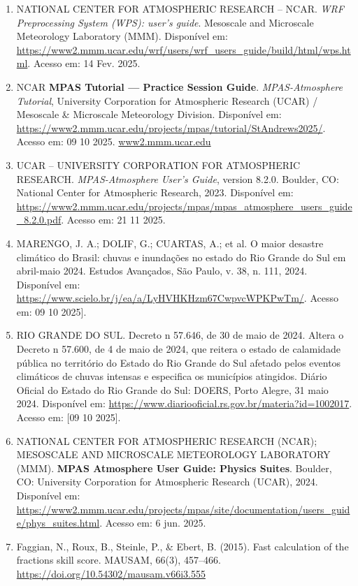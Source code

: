 \documentclass[12pt,a4paper,oneside]{book}
\begin{document}
\begin{enumerate}
\item
  NATIONAL CENTER FOR ATMOSPHERIC RESEARCH -- NCAR. \emph{WRF Preprocessing System (WPS): user's guide}. Mesoscale and Microscale Meteorology Laboratory (MMM). Disponível em: \url{https://www2.mmm.ucar.edu/wrf/users/wrf_users_guide/build/html/wps.html}. Acesso em: 14 Fev. 2025.
\item
  NCAR \textbf{MPAS Tutorial --- Practice Session Guide}. \emph{MPAS-Atmosphere Tutorial}, University Corporation for Atmospheric Research (UCAR) / Mesoscale \& Microscale Meteorology Division. Disponível em: \url{https://www2.mmm.ucar.edu/projects/mpas/tutorial/StAndrews2025/}. Acesso em: 09 10 2025. \href{https://www2.mmm.ucar.edu/projects/mpas/tutorial/StAndrews2025/}{www2.mmm.ucar.edu}
\item
  UCAR -- UNIVERSITY CORPORATION FOR ATMOSPHERIC RESEARCH. \emph{MPAS-Atmosphere User's Guide}, version 8.2.0. Boulder, CO: National Center for Atmospheric Research, 2023. Disponível em: \url{https://www2.mmm.ucar.edu/projects/mpas/mpas_atmosphere_users_guide_8.2.0.pdf}. Acesso em: 21 11 2025.
\item
  MARENGO, J. A.; DOLIF, G.; CUARTAS, A.; et al. O maior desastre climático do Brasil: chuvas e inundações no estado do Rio Grande do Sul em abril-maio 2024. Estudos Avançados, São Paulo, v. 38, n. 111, 2024. Disponível em: \url{https://www.scielo.br/j/ea/a/LyHVHKHzm67CwpvcWPKPwTm/}. Acesso em: 09 10 2025{]}.
\item
  RIO GRANDE DO SUL. Decreto n\textordmasculine{} 57.646, de 30 de maio de 2024. Altera o Decreto n\textordmasculine{} 57.600, de 4 de maio de 2024, que reitera o estado de calamidade pública no território do Estado do Rio Grande do Sul afetado pelos eventos climáticos de chuvas intensas e especifica os municípios atingidos. Diário Oficial do Estado do Rio Grande do Sul: DOERS, Porto Alegre, 31 maio 2024. Disponível em: \url{https://www.diariooficial.rs.gov.br/materia?id=1002017}. Acesso em: {[}09 10 2025{]}.
\item
  NATIONAL CENTER FOR ATMOSPHERIC RESEARCH (NCAR); MESOSCALE AND MICROSCALE METEOROLOGY LABORATORY (MMM). \textbf{MPAS Atmosphere User Guide: Physics Suites}. Boulder, CO: University Corporation for Atmospheric Research (UCAR), 2024. Disponível em: \url{https://www2.mmm.ucar.edu/projects/mpas/site/documentation/users_guide/phys_suites.html}. Acesso em: 6 jun. 2025.
\item
  Faggian, N., Roux, B., Steinle, P., \& Ebert, B. (2015). Fast calculation of the fractions skill score. MAUSAM, 66(3), 457--466. \url{https://doi.org/10.54302/mausam.v66i3.555}

\end{enumerate}
\end{document}
